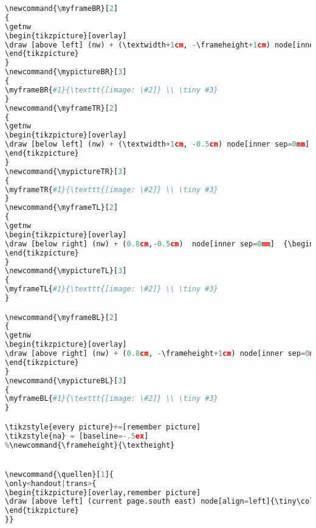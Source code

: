 {\begin{lstlisting}[language=Python,style=normal,escapechar=?,morekeywords={True, False}, mathescape]
\newcommand{\myframeBR}[2]
{
\getnw
\begin{tikzpicture}[overlay]
\draw [above left] (nw) + (\textwidth+1cm, -\frameheight+1cm) node[inner sep=0mm]  {\begin{minipage}[b]{#1} #2 \end{minipage}};
\end{tikzpicture}
}
\newcommand{\mypictureBR}[3]
{
\myframeBR{#1}{\texttt{[image: \#2]} \\ \tiny #3}
}
\newcommand{\myframeTR}[2]
{
\getnw
\begin{tikzpicture}[overlay]
\draw [below left] (nw) + (\textwidth+1cm, -0.5cm) node[inner sep=0mm]  {\begin{minipage}[b]{#1} #2 \end{minipage}};
\end{tikzpicture}
}
\newcommand{\mypictureTR}[3]
{
\myframeTR{#1}{\texttt{[image: \#2]} \\ \tiny #3}
}
\newcommand{\myframeTL}[2]
{
\getnw
\begin{tikzpicture}[overlay]
\draw [below right] (nw) + (0.8cm,-0.5cm)  node[inner sep=0mm]  {\begin{minipage}[b]{#1} #2 \end{minipage}};
\end{tikzpicture}
}
\newcommand{\mypictureTL}[3]
{
\myframeTL{#1}{\texttt{[image: \#2]} \\ \tiny #3}
}

\newcommand{\myframeBL}[2]
{
\getnw
\begin{tikzpicture}[overlay]
\draw [above right] (nw) + (0.8cm, -\frameheight+1cm) node[inner sep=0mm]  {\begin{minipage}[b]{#1} #2 \end{minipage}};
\end{tikzpicture}
}
\newcommand{\mypictureBL}[3]
{
\myframeBL{#1}{\texttt{[image: \#2]} \\ \tiny #3}
}

\tikzstyle{every picture}+=[remember picture]
\tikzstyle{na} = [baseline=-.5ex]
%\newcommand{\frameheight}{\textheight}


\newcommand{\quellen}[1]{
\only<handout|trans>{
\begin{tikzpicture}[overlay,remember picture]
\draw [above left] (current page.south east) node[align=left]{\tiny\color{gray}\rotatebox{90}{\parbox[l]{20cm}{#1}}};
\end{tikzpicture}
}}



\end{lstlisting}}
